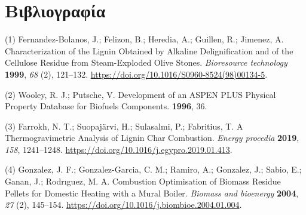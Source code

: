 \documentclass[11pt]{article}
\begin{document}
\section{Βιβλιογραφία}
\label{sec:org771a268}
\hypertarget{citeproc_bib_item_1}{(1) Fernandez-Bolanos, J.; Felizon, B.; Heredia, A.; Guillen, R.; Jimenez, A. Characterization of the Lignin Obtained by Alkaline Delignification and of the Cellulose Residue from Steam-Exploded Olive Stones. \textit{Bioresource technology} \textbf{1999}, \textit{68} (2), 121–132. \url{https://doi.org/10.1016/S0960-8524(98)00134-5}.}

\hypertarget{citeproc_bib_item_2}{(2) Wooley, R. J.; Putsche, V. Development of an ASPEN PLUS Physical Property Database for Biofuels Components. \textbf{1996}, 36.}

\hypertarget{citeproc_bib_item_3}{(3) Farrokh, N. T.; Suopajärvi, H.; Sulasalmi, P.; Fabritius, T. A Thermogravimetric Analysis of Lignin Char Combustion. \textit{Energy procedia} \textbf{2019}, \textit{158}, 1241–1248. \url{https://doi.org/10.1016/j.egypro.2019.01.413}.}

\hypertarget{citeproc_bib_item_4}{(4) Gonzalez, J. F.; Gonzalez-Garcia, C. M.; Ramiro, A.; Gonzalez, J.; Sabio, E.; Ganan, J.; Rodrıguez, M. A. Combustion Optimisation of Biomass Residue Pellets for Domestic Heating with a Mural Boiler. \textit{Biomass and bioenergy} \textbf{2004}, \textit{27} (2), 145–154. \url{https://doi.org/10.1016/j.biombioe.2004.01.004}.}
\end{document}
